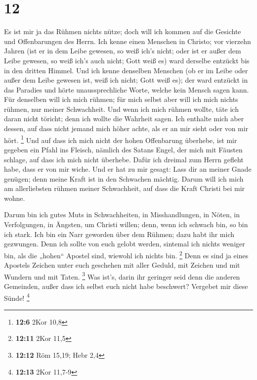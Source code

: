 \hypertarget{section-6}{%
\section{12}\label{section-6}}

 Es ist mir ja das Rühmen nichts nütze; doch will ich
kommen auf die Gesichte und Offenbarungen des Herrn.  Ich
kenne einen Menschen in Christo; vor vierzehn Jahren (ist er in dem
Leibe gewesen, so weiß ich's nicht; oder ist er außer dem Leibe gewesen,
so weiß ich's auch nicht; Gott weiß es) ward derselbe entzückt bis in
den dritten Himmel.  Und ich kenne denselben Menschen (ob
er im Leibe oder außer dem Leibe gewesen ist, weiß ich nicht; Gott weiß
es);  der ward entzückt in das Paradies und hörte
unaussprechliche Worte, welche kein Mensch sagen kann. 
Für denselben will ich mich rühmen; für mich selbst aber will ich mich
nichts rühmen, nur meiner Schwachheit.  Und wenn ich mich
rühmen wollte, täte ich daran nicht töricht; denn ich wollte die
Wahrheit sagen. Ich enthalte mich aber dessen, auf dass nicht jemand
mich höher achte, als er an mir sieht oder von mir hört. \footnote{\textbf{12:6}
  2Kor 10,8}  Und auf dass ich mich nicht der hohen
Offenbarung überhebe, ist mir gegeben ein Pfahl ins Fleisch, nämlich des
Satans Engel, der mich mit Fäusten schlage, auf dass ich mich nicht
überhebe.  Dafür ich dreimal zum Herrn gefleht habe, dass
er von mir wiche.  Und er hat zu mir gesagt: Lass dir an
meiner Gnade genügen; denn meine Kraft ist in den Schwachen mächtig.
Darum will ich mich am allerliebsten rühmen meiner Schwachheit, auf dass
die Kraft Christi bei mir wohne.

 Darum bin ich gutes Muts in Schwachheiten, in
Misshandlungen, in Nöten, in Verfolgungen, in Ängsten, um Christi
willen; denn, wenn ich schwach bin, so bin ich stark. 
Ich bin ein Narr geworden über dem Rühmen; dazu habt ihr mich gezwungen.
Denn ich sollte von euch gelobt werden, sintemal ich nichts weniger bin,
als die „hohen`` Apostel sind, wiewohl ich nichts bin. \footnote{\textbf{12:11}
  2Kor 11,5}  Denn es sind ja eines Apostels Zeichen
unter euch geschehen mit aller Geduld, mit Zeichen und mit Wundern und
mit Taten. \footnote{\textbf{12:12} Röm 15,19; Hebr 2,4} 
Was ist's, darin ihr geringer seid denn die anderen Gemeinden, außer
dass ich selbst euch nicht habe beschwert? Vergebet mir diese Sünde!
\footnote{\textbf{12:13} 2Kor 11,7-9}

